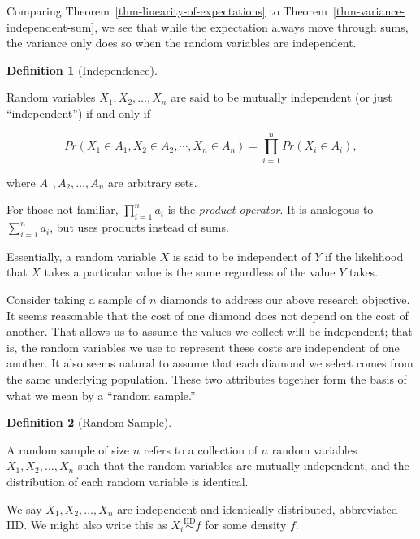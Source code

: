 \documentclass[
  letterpaper,
  DIV=11,
  numbers=noendperiod]{scrreprt}
\theoremstyle{definition}
\newtheorem{definition}{Definition}[chapter]
\theoremstyle{definition}
\theoremstyle{plain}
\theoremstyle{remark}
\begin{document}
Comparing Theorem~\ref{thm-linearity-of-expectations} to
Theorem~\ref{thm-variance-independent-sum}, we see that while the
expectation always move through sums, the variance only does so when the
random variables are independent.

\begin{definition}[Independence]\protect\hypertarget{def-independence}{}\label{def-independence}

Random variables \(X_1, X_2, \dotsc, X_n\) are said to be mutually
independent (or just ``independent'') if and only if

\[Pr\left(X_1 \in A_1, X_2 \in A_2, \dotsb, X_n \in A_n\right) = \prod_{i=1}^{n} Pr\left(X_i \in A_i\right),\]

where \(A_1, A_2, \dotsc, A_n\) are arbitrary sets.

\end{definition}

\begin{tcolorbox}[enhanced jigsaw, title=\textcolor{quarto-callout-note-color}{\faInfo}\hspace{0.5em}{Note}, colbacktitle=quarto-callout-note-color!10!white, titlerule=0mm, toptitle=1mm, breakable, bottomtitle=1mm, colframe=quarto-callout-note-color-frame, opacitybacktitle=0.6, bottomrule=.15mm, arc=.35mm, toprule=.15mm, colback=white, rightrule=.15mm, coltitle=black, leftrule=.75mm, left=2mm, opacityback=0]

For those not familiar, \(\prod_{i=1}^n a_i\) is the \emph{product
operator}. It is analogous to \(\sum_{i=1}^{n} a_i\), but uses products
instead of sums.

\end{tcolorbox}

Essentially, a random variable \(X\) is said to be independent of \(Y\)
if the likelihood that \(X\) takes a particular value is the same
regardless of the value \(Y\) takes.

Consider taking a sample of \(n\) diamonds to address our above research
objective. It seems reasonable that the cost of one diamond does not
depend on the cost of another. That allows us to assume the values we
collect will be independent; that is, the random variables we use to
represent these costs are independent of one another. It also seems
natural to assume that each diamond we select comes from the same
underlying population. These two attributes together form the basis of
what we mean by a ``random sample.''

\begin{definition}[Random
Sample]\protect\hypertarget{def-random-sample}{}\label{def-random-sample}

A random sample of size \(n\) refers to a collection of \(n\) random
variables \(X_1, X_2, \dotsc, X_n\) such that the random variables are
mutually independent, and the distribution of each random variable is
identical.

We say \(X_1, X_2, \dotsc, X_n\) are independent and identically
distributed, abbreviated IID. We might also write this as
\(X_i \stackrel{\text{IID}}{\sim} f\) for some density \(f\).

\end{definition}
\end{document}
